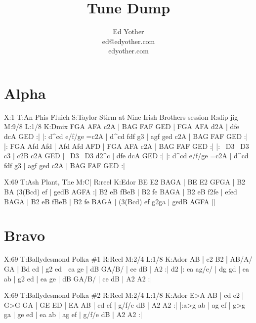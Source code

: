 \documentclass[letterpaper]{article}
\title{Tune Dump}
\author{Ed Yother\\ed@edyother.com\\edyother.com}
\begin{document}
\maketitle
	
\tableofcontents

\section{Alpha}
\begin{abc}[name]
X:1
T:An Phis Fluich
S:Taylor Stirm at Nine Irish Brothers session
R:slip jig
M:9/8
L:1/8
K:Dmix
FGA AFA c2A | BAG FAF GED | FGA AFA d2A | dfe dcA GED :|
|: d^cd e/f/ge =c2A | d^cd fdf g3 | agf ged c2A | BAG FAF GED :|
|: FGA Afd Afd | Afd Afd AFD | FGA AFA c2A | BAG FAF GED :|
|: ~D3 ~D3 c3 | c2B c2A GED | ~D3 ~D3 d2^c | dfe dcA GED :|
|: d^cd e/f/ge =c2A | d^cd fdf g3 | agf ged c2A | BAG FAF GED :|
\end{abc}

\begin{abc}[name]
X:69
T:Ash Plant, The
M:C|
R:reel
K:Edor
BE E2 BAGA | BE E2 GFGA | B2 BA (3(Bcd) ef | gedB AGFA :|
B2 eB fBeB | B2 fe BAGA | B2 eB f2fe | efed BAGA |
B2 eB fBeB | B2 fe BAGA | (3(Bcd) ef g2ga | gedB AGFA |]
\end{abc}

\section{Bravo}
\begin{abc}[name]
X:69
T:Ballydesmond Polka \#1
R:Reel
M:2/4
L:1/8
K:Ador
AB | c2 B2 | AB/A/ GA | Bd ed | g2 ed |
ea ge | dB GA/B/ | ce dB | A2 :|
d2 |: ea ag/e/ | dg gd | ea ab | g2 ed |
ea ge | dB GA/B/ | ce dB | A2 A2 :|
\end{abc}

\begin{abc}[name]
X:69
T:Ballydesmond Polka \#2
R:Reel
M:2/4
L:1/8
K:Ador
E>A AB | cd e2 | G>G GA | GE ED |
EA AB | cd ef | g/f/e dB | A2 A2 :|
|:a>g ab | ag ef | g>g ga | ge ed |
ea ab | ag ef | g/f/e dB | A2 A2 :|
\end{abc}
\end{document}
